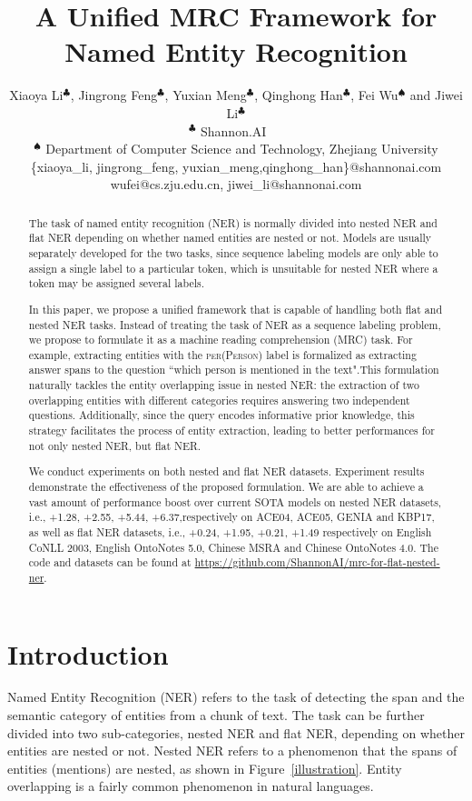 \documentclass[11pt,a4paper]{article}
\title{A Unified MRC Framework for Named Entity Recognition}
\author{Xiaoya Li$^{\clubsuit}$, Jingrong Feng$^{\clubsuit}$, Yuxian Meng$^{\clubsuit}$, Qinghong Han$^{\clubsuit}$, Fei Wu$^{\spadesuit}$ and Jiwei Li$^{\clubsuit}$  \\
$^{\clubsuit}$ Shannon.AI  ~~\\
$^{\spadesuit}$ Department of Computer Science and Technology, Zhejiang University\\
  \{xiaoya\_li, jingrong\_feng, yuxian\_meng,qinghong\_han\}@shannonai.com\\
   wufei@cs.zju.edu.cn,  jiwei\_li@shannonai.com
}
\date{}
\begin{document}
\maketitle

\begin{abstract}
The task of named entity recognition (NER)  is normally divided into nested NER and flat NER depending  on whether named entities are nested or not. Models are usually separately developed for the two tasks, since   sequence labeling models are only able to assign a single label to a particular token, which is unsuitable for nested NER where a token may be assigned several labels.

In this paper, we propose a unified framework  that is capable of handling both flat and nested NER tasks. Instead of treating the task of NER as a sequence labeling problem, we propose to formulate it as a machine reading comprehension (MRC) task. For example, extracting entities with the \textsc{per(Person)} label is formalized as extracting answer spans to the question  ``which person is mentioned in the text".This formulation naturally  tackles the entity overlapping issue in nested NER: the extraction of two overlapping entities with different categories requires answering two independent questions. Additionally, since the query encodes informative prior knowledge, this strategy facilitates the process of entity extraction, leading to better performances for not only nested NER, but flat NER. 
 

We conduct experiments on both nested and flat NER datasets. Experiment results demonstrate  the effectiveness of the proposed formulation. We are able to achieve a vast amount of performance boost over current SOTA models on nested NER datasets, i.e.,   +1.28, +2.55, +5.44, +6.37,respectively on ACE04, ACE05, GENIA and KBP17, as well as flat NER datasets, i.e., +0.24, +1.95, +0.21, +1.49 respectively on English CoNLL 2003, English OntoNotes 5.0, Chinese MSRA and Chinese OntoNotes 4.0. The code and datasets can be found at \url{ https://github.com/ShannonAI/mrc-for-flat-nested-ner}.



\end{abstract}

\section{Introduction}



Named Entity Recognition (NER)  refers to the task of detecting the span and the semantic category of entities from a chunk of text.
The task can be further divided into two sub-categories, nested NER and flat NER,  
depending  on whether entities are nested or not. 
Nested NER refers to a phenomenon that the spans of entities (mentions) are nested, 
as shown in Figure~\ref{illustration}. Entity overlapping is a fairly common phenomenon in natural languages.   
\end{document}
